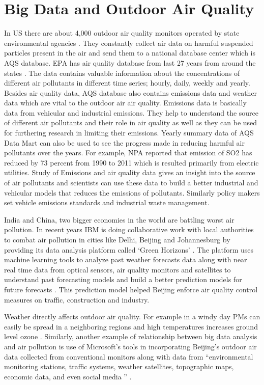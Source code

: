 \documentclass[sigconf]{acmart}
\begin{document}
\section{Big Data and Outdoor Air Quality}
In US there are about 4,000 outdoor air quality monitors operated by state environmental agencies \cite{outdoor-air}. They constantly collect air data on harmful suspended particles present in the air and send them to a national database center which is
   AQS database. EPA has air quality database from last 27 years from around the states \cite{googlecloud}. The data contains valuable information about the concentrations of different air pollutants in different time series; hourly, daily, weekly and yearly. Besides air quality data, AQS database also contains emissions data and weather data which are vital to the outdoor air air quality. Emissions data is basically data from vehicular and industrial emissions. They help to  understand the source of different air pollutants and their role in air quality as well as they can be used for furthering research in limiting their emissions. Yearly summary data of AQS Data Mart can also be used to see the progress made in reducing harmful air pollutants over the years. For example, NPA reported that emission of SO2 has reduced by 73 percent from 1990 to 2011 which is resulted primarily from electric utilities. Study of Emissions and air quality data gives an insight into the source of air pollutants and scientists can use these data to build a better industrial and vehicular models that reduces the emissions of pollutants. Similarly policy makers set vehicle emissions standards and industrial waste management. 

India and China, two bigger economies in the world are battling worst air pollution. In recent years IBM is doing collaborative work with local authorities to combat air pollution in cities like Delhi, Beijing and Johannesburg by providing its data analysis platform called `Green Horizons' \cite{www-huffingtonpost-com}. The platform uses machine learning tools to analyze past weather forecasts data along with near real time data from optical sensors, air quality monitors and satellites to understand past forecasting models and build a better prediction models for future forecasts \cite{www-huffingtonpost-com}. This prediction model helped Beijing enforce air quality control measures on traffic, construction and industry. 

Weather directly affects outdoor air quality. For example in a windy day PMs can easily be spread in a neighboring regions and high temperatures increases ground level ozone \cite{www-huffingtonpost-com}. Similarly, another example of relationship between big data analysis and air pollution is use of Microsoft's tools in incorporating Beijing's outdoor air data collected from conventional monitors along with data from ``environmental monitoring stations, traffic systems, weather satellites, topographic maps, economic data, and even social media '' \cite{spectrum-ieee}. 
\end{document}
